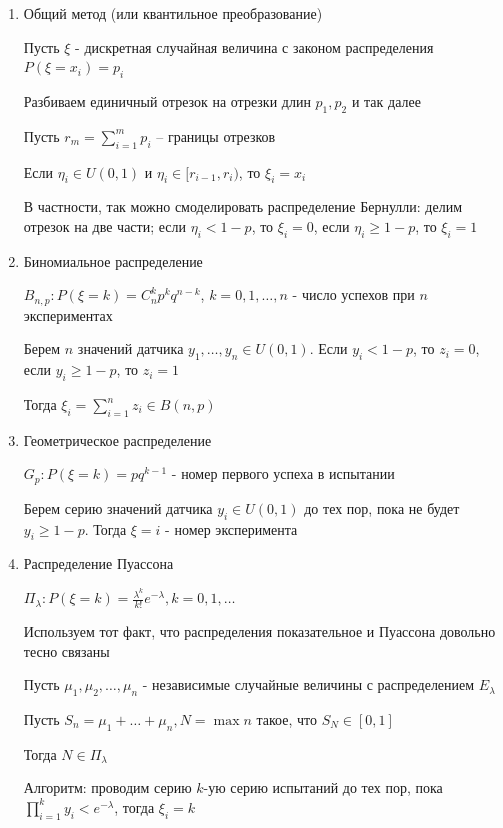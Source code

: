 \documentclass[12pt]{article}
\begin{document}
\begin{enumerate}[label*=\Roman*. ]
    \item Общий метод (или квантильное преобразование)

    Пусть $\xi$ - дискретная случайная величина с законом распределения $P(\xi = x_i) = p_i$

    Разбиваем единичный отрезок на отрезки длин $p_1, p_2$ и так далее

    Пусть $r_m = \sum_{i = 1}^m p_i$ -- границы отрезков

    Если $\eta_i \in U(0, 1)$ и $\eta_i \in [r_{i-1}, r_{i})$, то $\xi_i = x_i$

    В частности, так можно смоделировать распределение Бернулли: делим отрезок на две части; если $\eta_i < 1 - p$, то $\xi_i = 0$, если $\eta_i \geq 1 - p$, то $\xi_i = 1$

    \item Биномиальное распределение

    $B_{n,p}: P(\xi = k) = C_n^k p^k q^{n - k}$, $k = 0, 1, \dots, n$ - число успехов при $n$ экспериментах
    
    Берем $n$ значений датчика $y_1, \dots, y_n \in U(0, 1)$. Если $y_i < 1 - p$, то $z_i = 0$, если $y_i \geq 1 - p$, то $z_i = 1$

    Тогда $\xi_i = \sum_{i = 1}^n z_i \in B(n, p)$

    \item Геометрическое распределение

    $G_p: P(\xi = k) = p q^{k - 1}$ - номер первого успеха в испытании

    Берем серию значений датчика $y_i \in U(0, 1)$ до тех пор, пока не будет $y_i \geq 1 - p$. Тогда $\xi = i$ - номер эксперимента

    \item Распределение Пуассона

    $\Pi_\lambda: P(\xi = k) = \frac{\lambda^k}{k!} e^{-\lambda}, k = 0, 1, \dots$

    Используем тот факт, что распределения показательное и Пуассона довольно тесно связаны

    \begin{MyTheorem}
        \Ths Пусть $\mu_1, \mu_2, \dots, \mu_n$ - независимые случайные величины с распределением $E_\lambda$

        Пусть $S_n = \mu_1 + \dots + \mu_n, N = \max n$ такое, что $S_N \in [0, 1]$

        Тогда $N \in \Pi_\lambda$
    \end{MyTheorem}

    Алгоритм: проводим серию $k$-ую серию испытаний до тех пор, пока $\prod^k_{i = 1} y_i < e^{-\lambda}$, тогда $\xi_i = k$

\end{enumerate}
\end{document}
